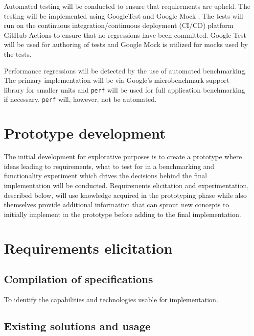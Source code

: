 Automated testing will be conducted to ensure that requirements are
upheld. The testing will be implemented using GoogleTest \cite{googletest}
and Google Mock \cite{googletest}. The tests will run on the
continuous integration/continuous deployment (CI/CD) platform
GitHub Actions \cite{github-actions} to ensure that no regressions
have been committed. Google Test will be used for authoring of
tests and Google Mock is utilized for mocks used by the tests.

Performance regressions will be detected by the use of automated
benchmarking. The primary implementation will be via Google's
microbenchmark support library \cite{google-benchmark} for smaller
units and \verb|perf| \cite{perf} will be used for full application
benchmarking if necessary. \verb|perf| will, however, not be
automated.

\section{Prototype development}
\label{sec:prototype-development}

The initial development for explorative purposes is to create a
prototype \cite[62]{sommerville-software-engineering} \cite[56]{thomas-hunt-pragmatic-programmer}
where ideas leading to requirements, what to test for in a
benchmarking and functionality experiment which drives the
decisions behind the final implementation will be conducted.
Requirements elicitation and experimentation, described below, will
use knowledge acquired in the prototyping phase while also
themselves provide additional information that can sprout new
concepts to initially implement in the prototype before adding to
the final implementation.

\section{Requirements elicitation}
\label{sec:requirements-elicitation}

\subsection{Compilation of specifications}

To identify the capabilities and technologies usable for
implementation.

\subsection{Existing solutions and usage}

